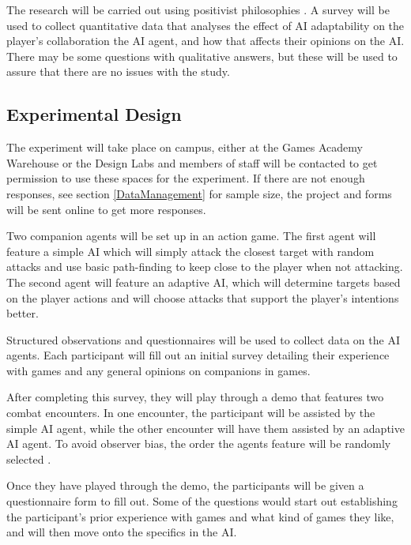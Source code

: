 \documentclass{IEEEtran}
\begin{document}
The research will be carried out using positivist philosophies \cite{Zukauskas18}. A survey will be used to collect quantitative data that analyses the effect of AI adaptability on the player's collaboration the AI agent, and how that affects their opinions on the AI. There may be some questions with qualitative answers, but these will be used to assure that there are no issues with the study.

\subsection{Experimental Design}
\label{ExperimentalDesign}



The experiment will take place on campus, either at the Games Academy Warehouse or the Design Labs and members of staff will be contacted to get permission to use these spaces for the experiment. If there are not enough responses, see section \ref{DataManagement} for sample size, the project and forms will be sent online to get more responses.

Two companion agents will be set up in an action game. The first agent will feature a simple AI which will simply attack the closest target with random attacks and use basic path-finding to keep close to the player when not attacking. The second agent will feature an adaptive AI, which will determine targets based on the player actions and will choose attacks that support the player's intentions better.

Structured observations and questionnaires will be used to collect data on the AI agents. Each participant will fill out an initial survey detailing their experience with games and any general opinions on companions in games.

After completing this survey, they will play through a demo that features two combat encounters. In one encounter, the participant will be assisted by the simple AI agent, while the other encounter will have them assisted by an adaptive AI agent. To avoid observer bias, the order the agents feature will be randomly selected \cite{hrobjartsson2013observer}.

Once they have played through the demo, the participants will be given a questionnaire form to fill out. Some of the questions would start out establishing the participant's prior experience with games and what kind of games they like, and will then move onto the specifics in the AI.
\end{document}
